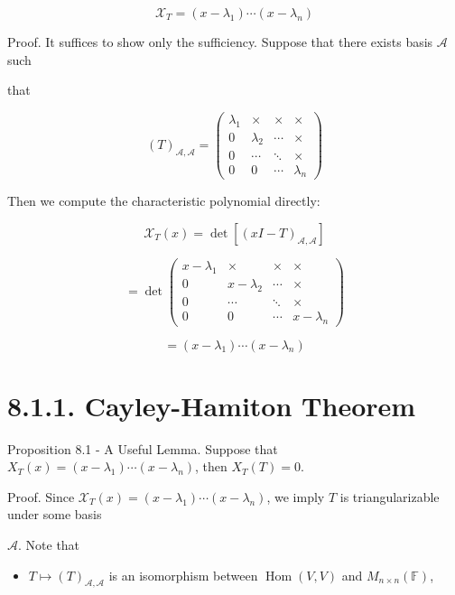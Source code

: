 \documentclass[11pt]{article}
\begin{document}
\[
{\mathcal{X}}_{T} = \left( {x - {\lambda }_1}\right) \cdots \left( {x - {\lambda }_n}\right)
\]

Proof. It suffices to show only the sufficiency. Suppose that there exists basis \(\mathcal{A}\) such

that

\[
{\left( T\right) }_{\mathcal{A},\mathcal{A}} = \left( \begin{matrix} {\lambda }_1 &  \times  &  \times  &  \times  \\  0 & {\lambda }_2 & \cdots &  \times  \\  0 & \cdots &  \ddots  &  \times  \\  0 & 0 & \cdots & {\lambda }_n \end{matrix}\right)
\]

Then we compute the characteristic polynomial directly:

\[
{\mathcal{X}}_{T}\left( x\right)  = \det \left\lbrack  {\left( xI - T\right) }_{\mathcal{A},\mathcal{A}}\right\rbrack
\]

\[
= \det \left( \begin{matrix} x - {\lambda }_1 &  \times  &  \times  &  \times  \\  0 & x - {\lambda }_2 & \cdots &  \times  \\  0 & \cdots &  \ddots  &  \times  \\  0 & 0 & \cdots & x - {\lambda }_n \end{matrix}\right)
\]

\[
= \left( {x - {\lambda }_1}\right) \cdots \left( {x - {\lambda }_n}\right)
\]

\section*{8.1.1. Cayley-Hamiton Theorem}

Proposition 8.1 - A Useful Lemma. Suppose that \({X}_{T}\left( x\right)  = \left( {x - {\lambda }_1}\right) \cdots \left( {x - {\lambda }_n}\right)\), then \({X}_{T}\left( T\right)  = 0\).

Proof. Since \({\mathcal{X}}_{T}\left( x\right)  = \left( {x - {\lambda }_1}\right) \cdots \left( {x - {\lambda }_n}\right)\), we imply \(T\) is triangularizable under some basis

\(\mathcal{A}\). Note that

\begin{itemize}
\item \(T \mapsto  {\left( T\right) }_{\mathcal{A},\mathcal{A}}\) is an isomorphism between \(\operatorname{Hom}\left( {V,V}\right)\) and \({M}_{n \times  n}\left( \mathbb{F}\right)\),
\end{itemize}
\end{document}
